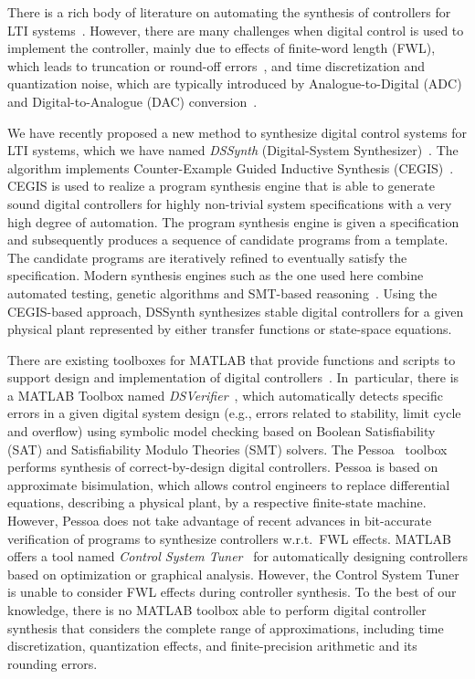 \documentclass[10pt,conference]{IEEEtran}
\begin{document}
There is a rich body of literature on automating the synthesis of
controllers for LTI systems~\cite{mazo2010pessoa,
DBLP:conf/emsoft/RavanbakhshS16, economakos2016automated}.  However, there
are many challenges when digital control is used to implement the
controller, mainly due to effects of finite-word length (FWL), which leads
to truncation or round-off errors~\cite{Guang2013, Istepanian2001}, and time
discretization and quantization noise, which are typically introduced by
Analogue-to-Digital (ADC) and Digital-to-Analogue (DAC)
conversion~\cite{astrom1997computer}.

We have recently proposed a new method to synthesize digital control systems
for LTI systems, which we have named \emph{DSSynth} (Digital-System
Synthesizer)~\cite{abate2017, abatecav2017}.  The algorithm implements
Counter-Example Guided Inductive Synthesis
(CEGIS)~\cite{DBLP:conf/asplos/Solar-LezamaTBSS06}.  CEGIS is used to
realize a program synthesis engine that is able to generate sound digital
controllers for highly non-trivial system specifications with a very high
degree of automation.  The program synthesis engine is given a specification
and subsequently produces a sequence of candidate programs from a template. 
The candidate programs are iteratively refined to eventually satisfy the
specification.  Modern synthesis engines such as the one used here combine
automated testing, genetic algorithms and SMT-based
reasoning~\cite{DBLP:journals/corr/AlurFSS16a, DBLP:conf/lpar/DavidKL15}. 
Using the CEGIS-based approach, DSSynth synthesizes stable digital
controllers for a given physical plant represented by either transfer
functions or state-space equations.

There are existing toolboxes for MATLAB that provide functions and scripts
to support design and implementation of digital
controllers~\cite{matlab-toolbox}.  In~particular, there is a MATLAB Toolbox
named \emph{DSVerifier}~\cite{issta2017, DBLP:journals/tc/BessaIPCF17,
DBLP:journals/dafes/BessaICF16}, which automatically detects specific errors
in a given digital system design (e.g., errors related to stability, limit
cycle and overflow) using symbolic model checking based on Boolean
Satisfiability (SAT) and Satisfiability Modulo Theories (SMT) solvers.  The
Pessoa~\cite{mazo2010pessoa} toolbox performs synthesis of correct-by-design
digital controllers.  Pessoa is based on approximate bisimulation, which
allows control engineers to replace differential equations, describing a
physical plant, by a respective finite-state machine.  However, Pessoa does
not take advantage of recent advances in bit-accurate verification of
programs to synthesize controllers w.r.t.~FWL effects.  MATLAB offers a tool
named \emph{Control System Tuner}~\cite{autotuner} for automatically
designing controllers based on optimization or graphical analysis.  However,
the Control System Tuner is unable to consider FWL effects during controller
synthesis.  To the best of our knowledge, there is no MATLAB toolbox able to
perform digital controller synthesis that considers the complete range of
approximations, including time discretization, quantization effects, and
finite-precision arithmetic and its rounding errors.
\end{document}
